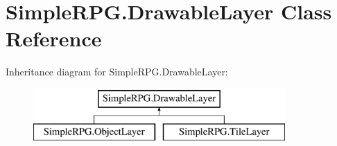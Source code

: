 \hypertarget{class_simple_r_p_g_1_1_drawable_layer}{\section{Simple\-R\-P\-G.\-Drawable\-Layer Class Reference}
\label{class_simple_r_p_g_1_1_drawable_layer}
}
Inheritance diagram for Simple\-R\-P\-G.\-Drawable\-Layer\-:\begin{figure}[H]
\begin{center}
\leavevmode
\includegraphics[height=2.000000cm]{class_simple_r_p_g_1_1_drawable_layer}
\end{center}
\end{figure}
